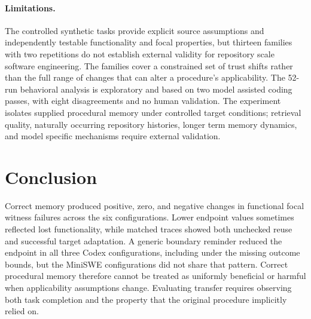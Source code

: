 \paragraph{Limitations.}
The controlled synthetic tasks provide explicit source assumptions and independently testable functionality and focal properties, but thirteen families with two repetitions do not establish external validity for repository scale software engineering. The families cover a constrained set of trust shifts rather than the full range of changes that can alter a procedure's applicability. The 52-run behavioral analysis is exploratory and based on two model assisted coding passes, with eight disagreements and no human validation. The experiment isolates supplied procedural memory under controlled target conditions; retrieval quality, naturally occurring repository histories, longer term memory dynamics, and model specific mechanisms require external validation.

\section{Conclusion}
Correct memory produced positive, zero, and negative changes in functional focal witness failures across the six configurations. Lower endpoint values sometimes reflected lost functionality, while matched traces showed both unchecked reuse and successful target adaptation. A generic boundary reminder reduced the endpoint in all three Codex configurations, including under the missing outcome bounds, but the MiniSWE configurations did not share that pattern. Correct procedural memory therefore cannot be treated as uniformly beneficial or harmful when applicability assumptions change. Evaluating transfer requires observing both task completion and the property that the original procedure implicitly relied on.
